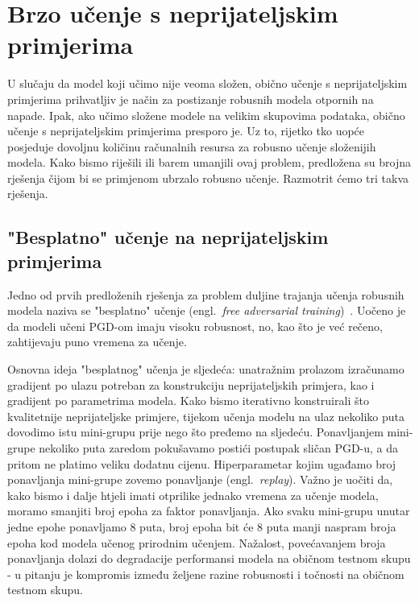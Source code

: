 \documentclass[times, utf8, zavrsni, numeric]{fer}
\begin{document}
\section{Brzo učenje s neprijateljskim primjerima}

U slučaju da model koji učimo nije veoma složen, obično učenje s neprijateljskim primjerima prihvatljiv je način za postizanje robusnih modela otpornih na napade.
Ipak, ako učimo složene modele na velikim skupovima podataka, obično učenje s neprijateljskim primjerima presporo je. 
Uz to, rijetko tko uopće posjeduje dovoljnu količinu računalnih resursa za robusno učenje složenijih modela.
Kako bismo riješili ili barem umanjili ovaj problem, predložena su brojna rješenja čijom bi se primjenom ubrzalo robusno učenje. Razmotrit ćemo tri takva rješenja.

\subsection{"Besplatno" učenje na neprijateljskim primjerima}

Jedno od prvih predloženih rješenja za problem duljine trajanja učenja robusnih modela naziva se "besplatno" učenje (engl.\ \textit{free adversarial training})~\cite{shafahi2019adversarial}.
Uočeno je da modeli učeni PGD-om imaju visoku robusnost, no, kao što je već rečeno, zahtijevaju puno vremena za učenje.

Osnovna ideja "besplatnog" učenja je sljedeća: unatražnim prolazom izračunamo gradijent po ulazu potreban za konstrukciju neprijateljskih primjera, kao i gradijent po parametrima modela.
Kako bismo iterativno konstruirali što kvalitetnije neprijateljske primjere, tijekom učenja modelu na ulaz nekoliko puta dovodimo istu mini-grupu prije nego što pređemo na sljedeću.
Ponavljanjem mini-grupe nekoliko puta zaredom pokušavamo postići postupak sličan PGD-u, a da pritom ne platimo veliku dodatnu cijenu. 
Hiperparametar kojim ugađamo broj ponavljanja mini-grupe zovemo ponavljanje (engl.\ \textit{replay}).
Važno je uočiti da, kako bismo i dalje htjeli imati otprilike jednako vremena za učenje modela, moramo smanjiti broj epoha za faktor ponavljanja. 
Ako svaku mini-grupu unutar jedne epohe ponavljamo 8 puta, broj epoha bit će 8 puta manji naspram broja epoha kod modela učenog prirodnim učenjem.
Nažalost, povećavanjem broja ponavljanja dolazi do degradacije performansi modela na običnom testnom skupu - u pitanju je kompromis između željene razine robusnosti i točnosti na običnom testnom skupu.
\end{document}

